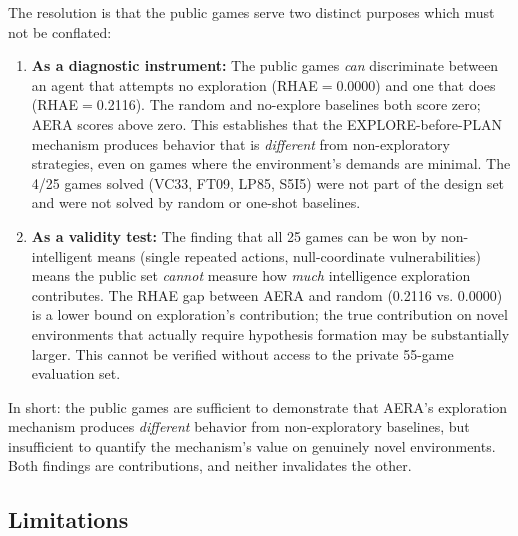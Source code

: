 \documentclass[11pt]{article}
\begin{document}
The resolution is that the public games serve two distinct purposes which must not be conflated:

\begin{enumerate}[leftmargin=*]
\item \textbf{As a diagnostic instrument:} The public games \emph{can} discriminate between an agent that attempts no exploration (RHAE$=$0.0000) and one that does (RHAE$=$0.2116). The random and no-explore baselines both score zero; AERA scores above zero. This establishes that the EXPLORE-before-PLAN mechanism produces behavior that is \emph{different} from non-exploratory strategies, even on games where the environment's demands are minimal. The 4/25 games solved (VC33, FT09, LP85, S5I5) were not part of the design set and were not solved by random or one-shot baselines.
\item \textbf{As a validity test:} The finding that all 25 games can be won by non-intelligent means (single repeated actions, null-coordinate vulnerabilities) means the public set \emph{cannot} measure how \emph{much} intelligence exploration contributes. The RHAE gap between AERA and random (0.2116 vs. 0.0000) is a lower bound on exploration's contribution; the true contribution on novel environments that actually require hypothesis formation may be substantially larger. This cannot be verified without access to the private 55-game evaluation set.
\end{enumerate}

In short: the public games are sufficient to demonstrate that AERA's exploration mechanism produces \emph{different} behavior from non-exploratory baselines, but insufficient to quantify the mechanism's value on genuinely novel environments. Both findings are contributions, and neither invalidates the other.

\subsection{Limitations}
\end{document}
